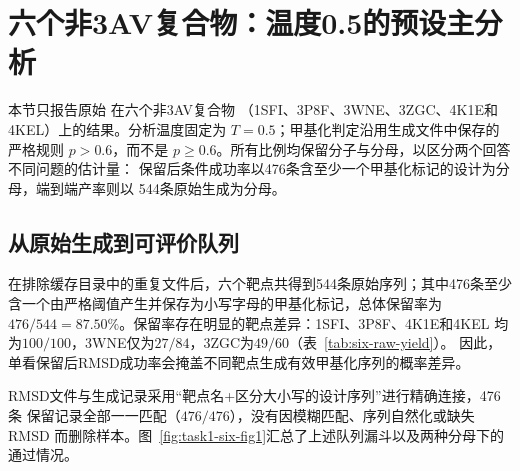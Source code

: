 \section{六个非3AV复合物：温度0.5的预设主分析}
\label{sec:results-six-complexes}

本节只报告原始  在六个非3AV复合物
（1SFI、3P8F、3WNE、3ZGC、4K1E和4KEL）上的结果。分析温度固定为
$T=0.5$；甲基化判定沿用生成文件中保存的严格规则 $p>0.6$，而不是
$p\geq 0.6$。所有比例均保留分子与分母，以区分两个回答不同问题的估计量：
保留后条件成功率以476条含至少一个甲基化标记的设计为分母，端到端产率则以
544条原始生成为分母。

\subsection{从原始生成到可评价队列}

在排除缓存目录中的重复文件后，六个靶点共得到544条原始序列；其中476条至少
含一个由严格阈值产生并保存为小写字母的甲基化标记，总体保留率为
$476/544=87.50\%$。保留率存在明显的靶点差异：1SFI、3P8F、4K1E和4KEL
均为$100/100$，3WNE仅为$27/84$，3ZGC为$49/60$（表~\ref{tab:six-raw-yield}）。
因此，单看保留后RMSD成功率会掩盖不同靶点生成有效甲基化序列的概率差异。

RMSD文件与生成记录采用“靶点名+区分大小写的设计序列”进行精确连接，476条
保留记录全部一一匹配（$476/476$），没有因模糊匹配、序列自然化或缺失RMSD
而删除样本。图~\ref{fig:task1-six-fig1}汇总了上述队列漏斗以及两种分母下的
通过情况。

